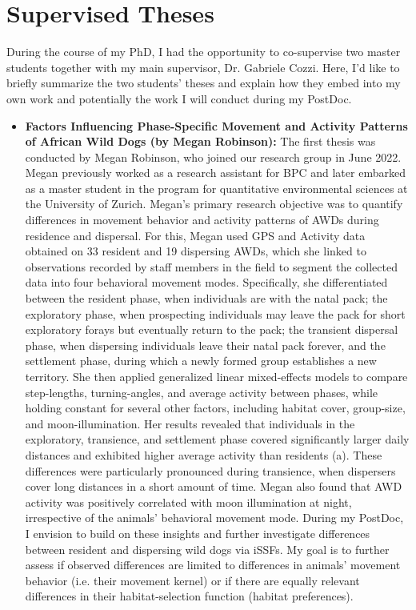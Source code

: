 \documentclass[../FinalThesis.tex]{subfiles}
\begin{document}
\section{Supervised Theses}
\label{Supervised}

During the course of my PhD, I had the opportunity to co-supervise two master
students together with my main supervisor, Dr. Gabriele Cozzi. Here, I'd like to
briefly summarize the two students' theses and explain how they embed into my
own work and potentially the work I will conduct during my PostDoc.

\begin{itemize}

  \item \textbf{Factors Influencing Phase-Specific Movement and Activity
  Patterns of African Wild Dogs (by Megan Robinson): } The first thesis was
  conducted by Megan Robinson, who joined our research group in June 2022. Megan
  previously worked as a research assistant for BPC and later embarked as a
  master student in the program for quantitative environmental sciences at the
  University of Zurich. Megan's primary research objective was to quantify
  differences in movement behavior and activity patterns of AWDs during
  residence and dispersal. For this, Megan used GPS and Activity data obtained
  on 33 resident and 19 dispersing AWDs, which she linked to observations
  recorded by staff members in the field to segment the collected data into four
  behavioral movement modes. Specifically, she differentiated between the
  resident phase, when individuals are with the natal pack; the exploratory
  phase, when prospecting individuals may leave the pack for short exploratory
  forays but eventually return to the pack; the transient dispersal phase, when
  dispersing individuals leave their natal pack forever, and the settlement
  phase, during which a newly formed group establishes a new territory. She then
  applied generalized linear mixed-effects models to compare step-lengths,
  turning-angles, and average activity between phases, while holding constant
  for several other factors, including habitat cover, group-size, and
  moon-illumination. Her results revealed that individuals in the exploratory,
  transience, and settlement phase covered significantly larger daily distances
  and exhibited higher average activity than residents (a).
  These differences were particularly pronounced during transience, when
  dispersers cover long distances in a short amount of time. Megan also found
  that AWD activity was positively correlated with moon illumination at night,
  irrespective of the animals' behavioral movement mode. During my PostDoc, I
  envision to build on these insights and further investigate differences
  between resident and dispersing wild dogs via iSSFs. My goal is to further
  assess if observed differences are limited to differences in animals' movement
  behavior (i.e. their movement kernel) or if there are equally relevant
  differences in their habitat-selection function (habitat preferences).


\end{itemize}
\end{document}
